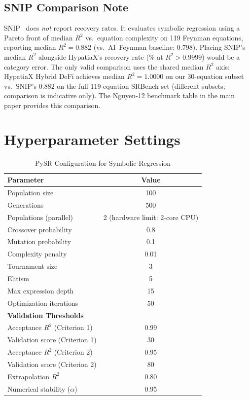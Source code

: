\documentclass[twoside,11pt]{article}
\begin{document}
\subsection*{SNIP Comparison Note}

SNIP~\citep{meidani2024snip} does \emph{not} report recovery rates.
It evaluates symbolic regression using a Pareto front of median
$R^2$ vs.\ equation complexity on 119 Feynman equations, reporting
median $R^2 = 0.882$ (vs.\ AI~Feynman baseline: $0.798$).
Placing SNIP's median $R^2$ alongside HypatiaX's recovery rate
(\% at $R^2>0.9999$) would be a category error.
The only valid comparison uses the shared median $R^2$ axis:
HypatiaX Hybrid DeFi achieves median $R^2 = 1.0000$ on our 30-equation
subset vs.\ SNIP's $0.882$ on the full 119-equation SRBench set
(different subsets; comparison is indicative only).
The Nguyen-12 benchmark table in the main paper provides this comparison.



\section{Hyperparameter Settings}
\label{app:hyperparameters}

\begin{table}[H]
\centering
\caption{PySR Configuration for Symbolic Regression}
\label{tab:hyperparameters}
\begin{tabular}{@{}lc@{}}
\toprule
\textbf{Parameter} & \textbf{Value} \\
\midrule
Population size & 100 \\
Generations & 500 \\
Populations (parallel) & 2 (hardware limit: 2-core CPU) \\
Crossover probability & 0.8 \\
Mutation probability & 0.1 \\
Complexity penalty & 0.01 \\
Tournament size & 3 \\
Elitism & 5 \\
Max expression depth & 15 \\
Optimization iterations & 50 \\
\midrule
\textbf{Validation Thresholds} & \\
\midrule
Acceptance $R^2$ (Criterion 1) & 0.99 \\
Validation score (Criterion 1) & 30 \\
Acceptance $R^2$ (Criterion 2) & 0.95 \\
Validation score (Criterion 2) & 80 \\
Extrapolation $R^2$ & 0.80 \\
Numerical stability ($\alpha$) & 0.95 \\
\bottomrule
\end{tabular}
\end{table}
\end{document}
